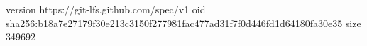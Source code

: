 version https://git-lfs.github.com/spec/v1
oid sha256:b18a7e27179f30e213c3150f277981fac477ad31f7f0d446fd1d64180fa30e35
size 349692
